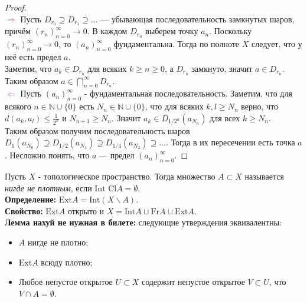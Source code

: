 \documentclass[a4paper,100pt]{article}
\theoremstyle{indented}
\begin{document}
\begin{proof} \textcolor{white}{fuck}\\

    \textcolor{magenta}{$\Rightarrow$} Пусть $D_{r_0} \supseteq D_{r_1} \supseteq \dots$ --- убывающая последовательность замкнутых шаров, причём $(r_n)_{n=0}^\infty \to 0$. В каждом $D_{r_n}$ выберем точку $a_n$. Поскольку $(r_n)_{n=0}^\infty \to 0$, то $(a_n)_{n=0}^\infty$ фундаментальна. Тогда по полноте $X$ следует, что у неё есть предел $a$. \\
    
    Заметим, что $a_k \in D_{r_n}$ для всяких $k \geqslant n \geqslant 0$, а $D_{r_n}$ замкнуто, значит $a \in D_{r_n}$. Таким образом $a \in \bigcap_{n=0}^\infty D_{r_n}$.\\

    \textcolor{magenta}{$\Leftarrow$} Пусть $(a_n)_{n=0}^\infty$ - фундаментальная последовательность. Заметим, что для всякого $n \in \mathbb{N} \cup \{0\}$ есть $N_n \in \mathbb{N} \cup \{0\}$, что для всяких $k, l \geqslant N_n$ верно, что $d(a_k, a_l) \leqslant \frac{1}{2^n}$ и $N_{n+1} \geqslant N_n$. Значит $a_k \in D_{1/2^n}(a_{N_n})$ для всех $k \geqslant N_n$.\\
        
    Таким образом получим последовательность шаров $D_{1}(a_{N_0}) \supseteq D_{1/2}(a_{N_1}) \supseteq D_{1/4}(a_{N_2}) \supseteq \dots$. Тогда в их пересечении есть точка $a$. Несложно понять, что $a$ --- предел $(a_n)_{n=0}^\infty$.
\end{proof}

Пусть $X$ - топологическое пространство. Тогда множество $A \subset X$ называется \textit{нигде не плотным}, если $\text{Int Cl}A = \emptyset$.\\

\textbf{Определение:} $\text{Ext} A=\text{Int}(X\backslash A)$.\\

\textbf{Свойство:} $\text{Ext} A$ открыто и $X = \text{Int}A \sqcup \text{Fr} A \sqcup \text{Ext}A$.\\

\textbf{Лемма нахуй не нужная в билете:} следующие утверждения эквивалентны:\

\begin{itemize}
    \item $A$ нигде не плотно;
    \item $\text{Ext} A$ всюду плотно;
    \item Любое непустое открытое $U \subset X$ содержит непустое открытое $V\subset U$, что $V\cap A = \emptyset$.
\end{itemize}
\end{document}
